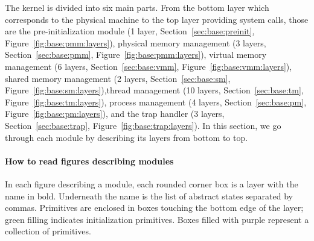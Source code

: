 The \mCTOSbase{} kernel is divided into six main parts.  From the
bottom layer which corresponds to the physical machine to the top
layer providing system calls, those are the pre-initialization module
(1 layer, Section~\ref{sec:base:preinit},
Figure~\ref{fig:base:pmm:layers}), physical memory management (3 layers,
Section~\ref{sec:base:pmm}, Figure~\ref{fig:base:pmm:layers}), virtual
memory management (6 layers, Section~\ref{sec:base:vmm},
Figure~\ref{fig:base:vmm:layers}), 
shared memory management (2 layers, Section~\ref{sec:base:sm},
Figure~\ref{fig:base:sm:layers}),thread management (10 layers,
Section~\ref{sec:base:tm}, Figure~\ref{fig:base:tm:layers}), process
management (4 layers, Section~\ref{sec:base:pm},
Figure~\ref{fig:base:pm:layers}), and the trap handler (3 layers,
Section~\ref{sec:base:trap}, Figure~\ref{fig:base:trap:layers}).  In
this section, we go through each module by describing its
layers from bottom to top.  

\paragraph{How to read figures describing modules}
In each figure describing a module, each rounded corner box is a layer
with the name in bold. Underneath the name is the list of abstract
states separated by commas. Primitives are enclosed in boxes
touching the bottom edge of the layer; green filling indicates
initialization primitives. Boxes filled with purple represent
a collection of primitives.


